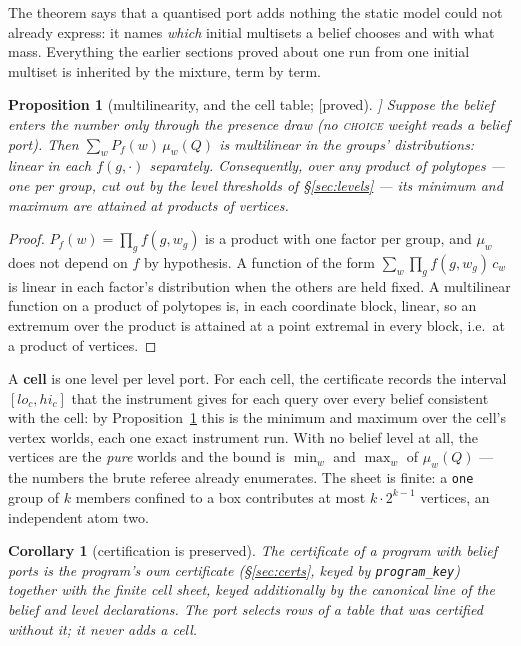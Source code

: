\documentclass[11pt]{article}
\newcommand{\stproved}{[\textsf{proved}]}
\theoremstyle{plain}
\newtheorem{proposition}[theorem]{Proposition}
\newtheorem{corollary}[theorem]{Corollary}
\theoremstyle{definition}
\theoremstyle{remark}
\begin{document}
The theorem says that a quantised port adds nothing the static model
could not already express: it names \emph{which} initial multisets a
belief chooses and with what mass. Everything the earlier sections
proved about one run from one initial multiset is inherited by the
mixture, term by term.

\begin{proposition}[multilinearity, and the cell table; \stproved{}]
\label{prop:cells}
Suppose the belief enters the number only through the presence draw
(no \textsc{choice} weight reads a belief port). Then
$\sum_w P_f(w)\,\mu_w(Q)$ is multilinear in the groups' distributions:
linear in each $f(g, \cdot)$ separately. Consequently, over any product
of polytopes --- one per group, cut out by the level thresholds of
\S\ref{sec:levels} --- its minimum and maximum are attained at products
of vertices.
\end{proposition}

\begin{proof}
$P_f(w) = \prod_g f(g, w_g)$ is a product with one factor per group, and
$\mu_w$ does not depend on $f$ by hypothesis. A function of the form
$\sum_w \prod_g f(g, w_g)\,c_w$ is linear in each factor's distribution
when the others are held fixed. A multilinear function on a product of
polytopes is, in each coordinate block, linear, so an extremum over the
product is attained at a point extremal in every block, i.e.\ at a
product of vertices.
\end{proof}

A \textbf{cell} is one level per level port. For each cell, the
certificate records the interval $[\mathit{lo}_c, \mathit{hi}_c]$ that
the instrument gives for each query over every belief consistent with
the cell: by Proposition~\ref{prop:cells} this is the minimum and maximum
over the cell's vertex worlds, each one exact instrument run. With no
belief level at all, the vertices are the \emph{pure} worlds and the
bound is $\min_w$ and $\max_w$ of $\mu_w(Q)$ --- the numbers the brute
referee already enumerates. The sheet is finite: a \texttt{one} group of
$k$ members confined to a box contributes at most $k \cdot 2^{k-1}$
vertices, an independent atom two.

\begin{corollary}[certification is preserved]\label{cor:cert}
The certificate of a program with belief ports is the program's own
certificate (\S\ref{sec:certs}, keyed by \texttt{program\_key}) together
with the finite cell sheet, keyed additionally by the canonical line of
the belief and level declarations. The port selects rows of a table
that was certified without it; it never adds a cell.
\end{corollary}
\end{document}
